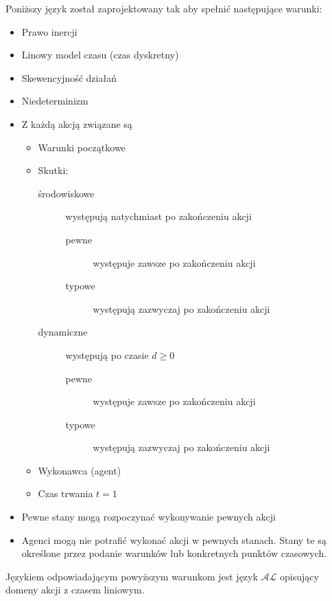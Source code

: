 Poniższy język został zaprojektowany tak aby spełnić następujące warunki:
\begin{itemize}
	\item Prawo inercji
	\item Linowy model czasu (czas dyskretny)
	\item Skewencyjność działań
	\item Niedeterminizm
	\item Z każdą akcją związane są
		\begin{itemize}
			\item Warunki początkowe
			\item Skutki:
				\begin{description}
					\item[środowiskowe] występują natychmiast po zakończeniu akcji
						\begin{description}
							\item[pewne] występuje zawsze po zakończeniu akcji
							\item[typowe] występują zazwyczaj po zakończeniu akcji
						\end{description}
					\item[dynamiczne] występują po czasie $d \geqslant 0$
						\begin{description}
							\item[pewne] występuje zawsze po zakończeniu akcji
							\item[typowe] występują zazwyczaj po zakończeniu akcji
						\end{description}
				\end{description}
			\item Wykonawca (agent)
			\item Czas trwania $t = 1$
		\end{itemize}
	\item Pewne stany mogą rozpoczynać wykonywanie pewnych akcji
	\item Agenci mogą nie potrafić wykonać akcji w pewnych stanach. Stany te są określone przez podanie
	warunków lub konkretnych punktów czasowych.
\end{itemize}
Językiem odpowiadającym powyższym warunkom jest język $\mathcal{AL}$
opisujący domeny akcji z czasem liniowym.

